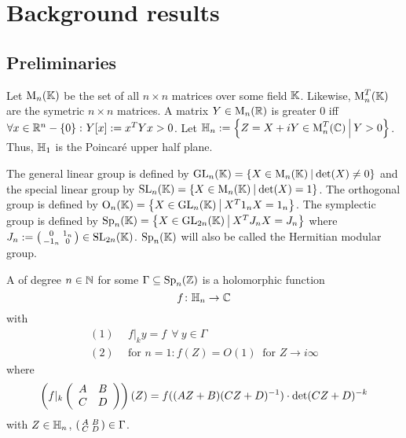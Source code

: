 
\section{Background results}

\subsection{Preliminaries}

Let $\operatorname{M}_n(\mathbb{K})$ be the set of all $n \times n$ matrices over some field $\mathbb{K}$.
Likewise, $\operatorname{M}_n^T(\mathbb{K})$ are the symetric $n \times n$ matrices.
A matrix $Y \in \operatorname{M}_n(\mathbb{R})$ is greater $0$ iff $\forall x \in \R^n - \Set{0} \colon Y[x] := x^T Y x > 0$.
Let $\HalfPlane_n := \Set{Z = X + iY \in \M_n^T(\C)}{Y > 0}$.
Thus, $\mathbb{H}_1$ is the Poincaré upper half plane.

The general linear group is defined by $\GL_n(\K) = \Set{X \in \M_n(\K)}{\det(X) \neq 0}$
and the special linear group by $\SL_n(\K) = \Set{X \in \M_n(\K)}{\det(X) = 1}$. %
The orthogonal group is defined by $\Orth_n(\K) = \Set{X \in \GL_n(\K)}{X^T 1_n X = 1_n}$. %
The symplectic group is defined by $\Sp_n(\K) = \Set{X \in \GL_{2n}(\K)}{X^T J_n X = J_n}$ %
where $J_n := \left( \begin{smallmatrix} 0 & 1_n \\ -1_n & 0 \end{smallmatrix} \right) \in \operatorname{SL}_{2n}(\mathbb{K})$. %
$\operatorname{Sp}_n(\mathbb{K})$ will also be called the Hermitian modular group.


A  of degree $n\in\mathbb{N}$ for some $\Gamma \subseteq \operatorname{Sp}_n(\mathbb{Z})$ is a holomorphic function
\[ f \colon \mathbb{H}_n \rightarrow \mathbb{C} \]
with
\begin{align*}
(1) \ \ & f |_k y = f \ \ \forall \ y \in \Gamma \\
(2) \ \ & \text{for } n = 1 \colon f(Z) = O(1) \ \text{ for } Z \rightarrow i \infty
\end{align*}
where
\[ \left( f|_k \left( \begin{array}{cc} A & B \\ C & D \end{array} \right) \right) (Z) =
f((AZ + B)(CZ + D)^{-1}) \cdot \det(CZ + D)^{-k} \]
with $Z \in \mathbb{H}_n$, $\left( \begin{smallmatrix} A & B \\ C & D \end{smallmatrix} \right) \in \Gamma$.

